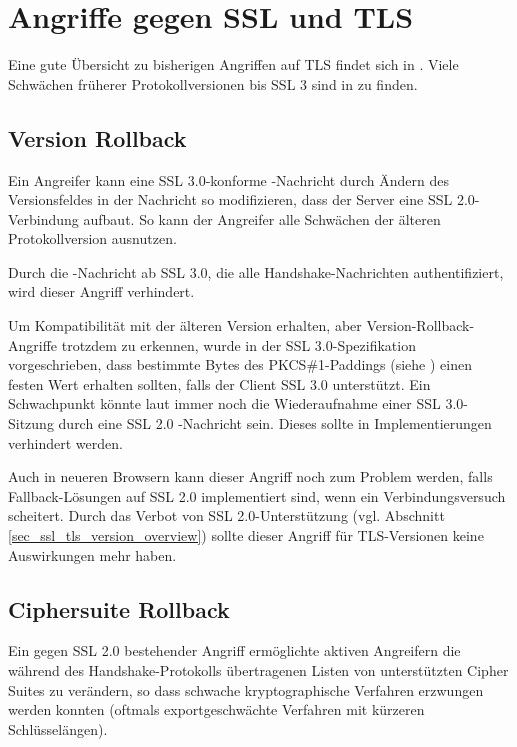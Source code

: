 
\chapter{Angriffe gegen SSL und TLS}


\label{cha_attacks}

Eine gute Übersicht zu bisherigen Angriffen auf TLS findet sich in \cite{meyer13}. Viele Schwächen früherer Protokollversionen bis SSL 3 sind in \cite{wagner96} zu finden.

\section{Version Rollback}

\label{sec_version_rollback}

Ein Angreifer kann eine SSL 3.0-konforme \clienthello{}-Nachricht durch Ändern des Versionsfeldes in der Nachricht so modifizieren, dass der Server eine SSL 2.0-Verbindung aufbaut. So kann der Angreifer alle Schwächen der älteren Protokollversion ausnutzen. 

Durch die \finished{}-Nachricht ab SSL 3.0, die alle Handshake-Nachrichten authentifiziert, wird dieser Angriff verhindert.

Um Kompatibilität mit der älteren Version erhalten, aber Version-Rollback-Angriffe trotzdem zu erkennen, wurde in der SSL 3.0-Spezifikation \cite{ssl30} vorgeschrieben, dass bestimmte Bytes des PKCS\#1-Paddings (siehe \cite{pkcs1}) einen festen Wert erhalten sollten, falls der Client SSL 3.0 unterstützt. Ein Schwachpunkt könnte laut \cite{wagner96} immer noch die Wiederaufnahme einer SSL 3.0-Sitzung durch eine SSL 2.0 \clienthello{}-Nachricht sein. Dieses sollte in Implementierungen verhindert werden.

Auch in neueren Browsern kann dieser Angriff noch zum Problem werden, falls Fallback-Lösungen auf SSL 2.0 implementiert sind, wenn ein Verbindungsversuch scheitert. Durch das Verbot von SSL 2.0-Unterstützung (vgl. Abschnitt \ref{sec_ssl_tls_version_overview}) sollte dieser Angriff für TLS-Versionen keine Auswirkungen mehr haben. 

\section{Ciphersuite Rollback}

Ein gegen SSL 2.0 bestehender Angriff ermöglichte aktiven Angreifern die während des Handshake-Protokolls übertragenen Listen von unterstützten Cipher Suites zu verändern, so dass schwache kryptographische Verfahren erzwungen werden konnten (oftmals exportgeschwächte Verfahren mit kürzeren Schlüsselängen).

